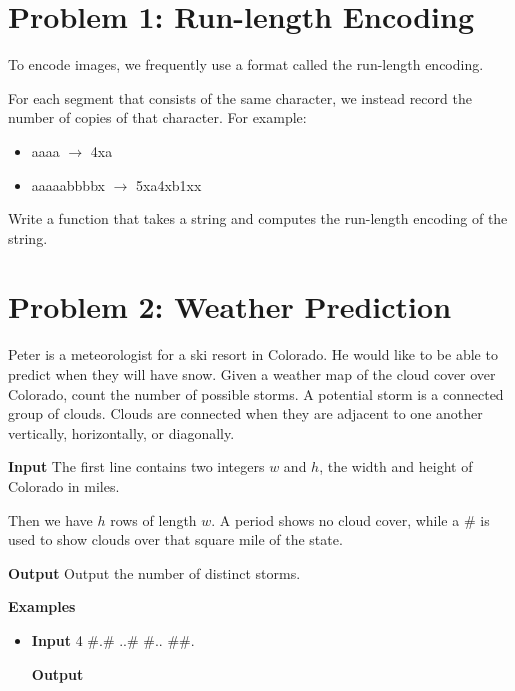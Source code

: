 \normalfont\documentclass[letterpaper,11pt]{article}
\begin{document}
\section*{Problem 1: Run-length Encoding}
To encode images, we frequently use a format called the run-length encoding.

For each segment that consists of the same character, we instead record the number of copies of that character. For example:
\begin{itemize}
\item aaaa $\rightarrow$ 4xa
\item aaaaabbbbx $\rightarrow$ 5xa4xb1xx
\end{itemize}

Write a function that takes a string and computes the run-length encoding of the string.

\vspace{1cm}


\section*{Problem 2: Weather Prediction}
Peter is a meteorologist for a ski resort in Colorado. He would like to be able to predict when they will have snow. Given a weather map of the cloud cover over Colorado, count the number of possible storms. A potential storm is a connected group of clouds. Clouds are connected when they are adjacent to one another vertically, horizontally, or diagonally.

\textbf{Input} \newline
The first line contains two integers $w$ and $h$, the width and height of Colorado in miles.

Then we have $h$ rows of length $w$. A period shows no cloud cover, while a \# is used to show clouds over that square mile of the state.

\textbf{Output} \newline
Output the number of distinct storms.

\textbf{Examples}
\begin{itemize}
\item \textbf{Input}  4 \newline
\#.\# \newline
..\# \newline
\#.. \newline
\#\#.

\textbf{Output} 
\end{itemize}
\end{document}
